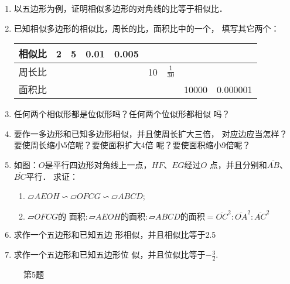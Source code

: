 \begin{ex}
\begin{enumerate}
    \item 以五边形为例，证明相似多边形的对角线的比等于相似比．
    \item 已知相似多边形的相似比，周长的比，面积比中的一个，
    填写其它两个：
\begin{center}
\begin{tabular}{c|cccccccc}
    \hline
    相似比 &    2&    5&    0.01&    0.005\\
    \hline
    周长比&&&&&    10&   $\tfrac{1}{30}$\\
    \hline
    面积比&&&&&&&    10000&    0.000001\\
    \hline
\end{tabular}
\end{center}

\item 任何两个相似形都是位似形吗？任何两个位似形都相似
吗？
\item 要作一多边形和已知多边形相似，并且使周长扩大三倍，
对应边应当怎样？要使周长缩小5倍呢？要使面积扩大4倍
呢？要使面积缩小9倍呢？
\item 如图：$O$是平行四边形对角线上一点，$HF$、$EG$经过$O$
点，并且分别和$\overline{AB}$、$\overline{BC}$平行．
求证：
\begin{enumerate}
    \item $\parallelogram{AEOH}\backsim \parallelogram OFCG \backsim \parallelogram ABCD$;
    \item $\parallelogram OFCG\text{的
面积}:\parallelogram AEOH\text{的面积}:\parallelogram ABCD\text{的面积}=\overline{OC}^2:\overline{OA}^2:\overline{AC}^2$
\end{enumerate}

\item 求作一个五边形和已知五边
形相似，并且相似比等于2.5
\item 求作一个五边形和已知五边形位
似，并且位似比等于$-\frac{3}{2}$.
\end{enumerate}
\end{ex}

\begin{figure}[htp]
    \centering
{}
    \caption*{第5题}
\end{figure}

